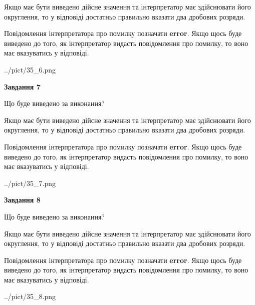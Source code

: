 \documentclass[12pt, ukrainian]{article}
\begin{document}
{\begin {Large}
Якщо має бути виведено дійсне значення та інтерпретатор має здійснювати його округлення, 
то у відповіді достатньо правильно вказати два дробових розряди.

Повідомлення інтерпретатора про помилку позначати \textbf{error}.
Якщо щось буде виведено до того, як інтерпретатор видасть повідомлення про помилку, 
то воно має вказуватись у відповіді. \par

\begin{center}
	{../pict/35_6.png}
\end{center}
\newpage

{\begin {center}\textbf{Завдання 7}\end {center}}\par
Що буде виведено за виконання? \par

Якщо має бути виведено дійсне значення та інтерпретатор має здійснювати його округлення, 
то у відповіді достатньо правильно вказати два дробових розряди.

Повідомлення інтерпретатора про помилку позначати \textbf{error}.
Якщо щось буде виведено до того, як інтерпретатор видасть повідомлення про помилку, 
то воно має вказуватись у відповіді. \par

\begin{center}
	{../pict/35_7.png}
\end{center}
\newpage

{\begin {center}\textbf{Завдання 8}\end {center}}\par
Що буде виведено за виконання? \par

Якщо має бути виведено дійсне значення та інтерпретатор має здійснювати його округлення, 
то у відповіді достатньо правильно вказати два дробових розряди.

Повідомлення інтерпретатора про помилку позначати \textbf{error}.
Якщо щось буде виведено до того, як інтерпретатор видасть повідомлення про помилку, 
то воно має вказуватись у відповіді. \par

\begin{center}
	{../pict/35_8.png}
\end{center}
\newpage


\end{Large}}
\end{document}
